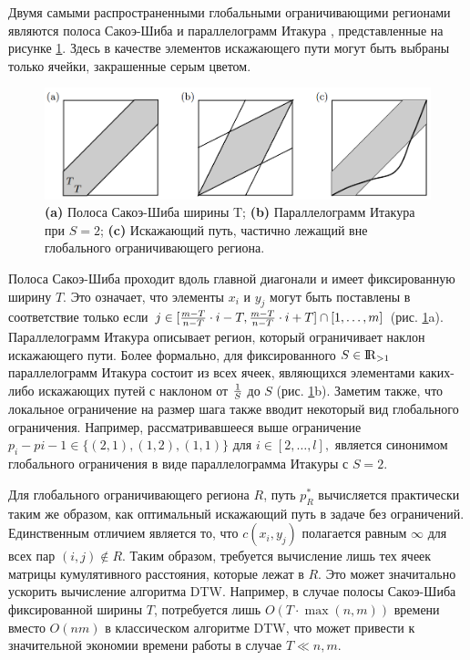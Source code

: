 \documentclass[a4paper, 14pt]{extarticle}
\numberwithin{figure}{subsection}
\numberwithin{equation}{subsection}
\begin{document}
Двумя самыми распространенными глобальными ограничивающими регионами являются полоса Сакоэ-Шиба \cite{sakoe1978dynamic} и параллелограмм Итакура \cite{itakura1975minimum}, представленные на рисунке \ref{fig:p7}. Здесь в качестве элементов искажающего пути могут быть выбраны только ячейки, закрашенные серым цветом.

\begin{figure}[h]
\centering
\includegraphics[width=15cm]{p7.png}
\caption{{\bf (a)} Полоса Сакоэ-Шиба ширины T; {\bf (b)} Параллелограмм Итакура при $S=2$; {\bf (c)} Искажающий путь, частично лежащий вне глобального ограничивающего региона.}
\label{fig:p7}
\end{figure}

Полоса Сакоэ-Шиба проходит вдоль главной диагонали и имеет фиксированную ширину $T$. Это означает, что элементы $x_i$ и $y_j$ могут быть поставлены в соответствие только если $j \in [{{m-T}\over{n-T}} \cdot i - T,{{m-T}\over{n-T} }\cdot i + T] \cap [1,\dots,m]$ (рис. \ref{fig:p7}a). Параллелограмм Итакура описывает регион, который ограничивает наклон искажающего пути. Более формально, для фиксированного $S \in {\rm I\!R}_{>1}$ параллелограмм Итакура состоит из всех ячеек, являющихся элементами каких-либо искажающих путей с наклоном от $1 \over S$ до $S$ (рис. \ref{fig:p7}b). Заметим также, что локальное ограничение на размер шага также вводит некоторый вид глобального ограничения. Например, рассматривавшееся выше ограничение $p_i-p{i-1} \in \{(2,1),(1,2),(1,1)\}$ для $i \in [2,\dots,l],$ является синонимом глобального ограничения в виде параллелограмма Итакуры с $S=2.$

Для глобального ограничивающего региона $R$, путь $p_R^*$ вычисляется практически таким же образом, как оптимальный искажающий путь в задаче без ограничений. Единственным отличием является то, что $c(x_i,y_j)$ полагается равным $\infty$ для всех пар $(i,j) \notin R$. Таким образом, требуется вычисление лишь тех ячеек матрицы кумулятивного расстояния, которые лежат в $R$. Это может значитально ускорить вычисление алгоритма DTW. Например, в случае полосы Сакоэ-Шиба фиксированной ширины $T$, потребуется лишь $O(T \cdot \max(n,m))$ времени вместо $O(nm)$ в классическом алгоритме DTW, что может привести к значительной экономии времени работы в случае $T \ll n,m.$
\end{document}
